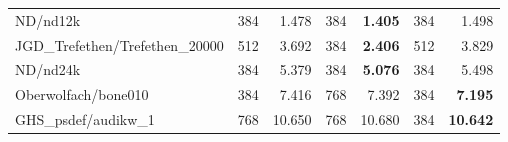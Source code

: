 \begin{tabular}{l|rr|rr|rr}
  ND/nd12k                        & 384                              & 1.478                      & 384  & \bf 1.405 & 384 & 1.498      \\
  JGD\_Trefethen/Trefethen\_20000 & 512                              & 3.692                      & 384  & \bf 2.406 & 512 & 3.829      \\
  ND/nd24k                        & 384                              & 5.379                      & 384  & \bf 5.076 & 384 & 5.498      \\
  Oberwolfach/bone010             & 384                              & 7.416                      & 768  & 7.392     & 384 & \bf 7.195  \\
  GHS\_psdef/audikw\_1            & 768                              & 10.650                     & 768  & 10.680    & 384 & \bf 10.642 \\
  \hline
\end{tabular}
